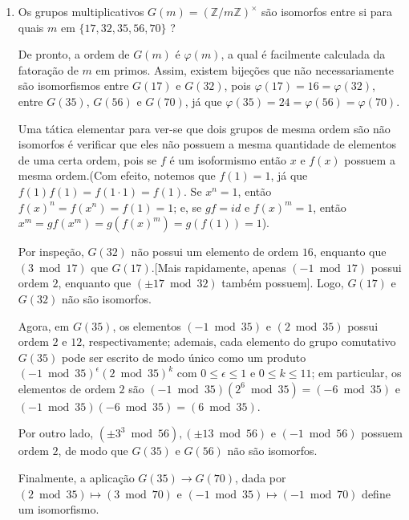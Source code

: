 \begin{exemplo}
\begin{enumerate}[left=0.5cm, align=left, nosep]
        \item Os grupos multiplicativos $G(m) = (\mathbb{Z}/m\mathbb{Z})^\times$ são isomorfos entre si para quais $m$ em $\{17, 32,
        35, 56, 70\}$ ?

        De pronto, a ordem de $G(m)$ é $\varphi(m)$, a qual é facilmente calculada da fatoração de $m$ em primos. Assim, existem
        bijeções que não necessariamente são isomorfismos entre $G(17)$ e $G(32)$, pois $\varphi(17) = 16 = \varphi(32)$, entre 
        $G(35)$, $G(56)$ e $G(70)$, já que $\varphi(35) = 24 = \varphi(56) = \varphi(70)$.

        Uma tática elementar para ver-se que dois grupos de mesma ordem são não isomorfos é verificar que eles não possuem a mesma quantidade de elementos de uma certa ordem, pois se $f$ é um isoformismo então $x$ e $f(x)$ possuem a mesma ordem.(Com efeito, notemos
        que $f(1) = 1$, já que $f(1) f(1) = f(1 \cdot 1) = f(1)$. Se $x^n = 1$, então $f(x)^n = f(x^n) = f(1) = 1$; e, se $gf = id$ e 
        $f(x)^m = 1$, então $x^m = gf(x^m) = g(f(x)^m) = g(f(1)) = 1$).

        Por inspeção, $G(32)$ não possui um elemento de ordem $16$, enquanto que $(3 \bmod 17)$ que $G(17)$.[Mais rapidamente, apenas
        $(-1 \bmod 17)$ possui ordem $2$, enquanto que $(\pm 17 \bmod 32)$ também possuem]. Logo, $G(17)$ e $G(32)$ não são isomorfos.

        Agora, em $G(35)$, os elementos $(-1 \bmod 35)$ e $(2 \bmod 35)$ possui ordem $2$ e $12$, respectivamente; ademais, cada
        elemento do grupo comutativo $G(35)$ pode ser escrito de modo único como um produto $(-1 \bmod 35)^\epsilon (2 \bmod 35)^k$
        com $0 \leq \epsilon \leq 1$ e $0 \leq k \leq 11$; em particular, os elementos de ordem $2$ são $(-1 \bmod 35)(2^6 \bmod 35)
        = (-6 \bmod 35)$ e $(-1 \bmod 35)(-6 \bmod 35) = (6 \bmod 35)$.

        Por outro lado, $(\pm 3^3 \bmod 56), (\pm 13 \bmod 56)$ e $(-1 \bmod 56)$ possuem ordem $2$, de modo que $G(35)$ e $G(56)$ 
        não são isomorfos.  

        Finalmente, a aplicação $G(35) \to G(70)$, dada por $(2 \bmod 35) \mapsto (3 \bmod 70)$ e $(-1 \bmod 35) \mapsto 
        (-1 \bmod 70)$ define um isomorfismo.

    \end{enumerate} 
\end{exemplo}
